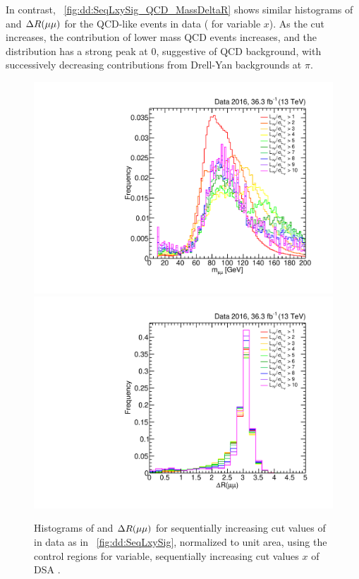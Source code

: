 In contrast, \Fig~\ref{fig:dd:SeqLxySig_QCD_MassDeltaR} shows similar histograms of \mMuMu and $\deltaR(\Pgm\Pgm)$ for the QCD-like events in data (\ie {} for variable $x$).
As the cut increases, the contribution of lower mass QCD events increases, and the \deltaR distribution has a strong peak at 0, suggestive of QCD background, with successively decreasing contributions from Drell-Yan backgrounds at $\pi$.

\begin{figure}[p]
  \centering
  \includegraphics[width=\DSquareWidth]{figures/displaced/BGEST_EffectOfLxySigCut_Mass_Data_DY-Like.pdf}
  \hspace*{-2em}
  \includegraphics[width=\DSquareWidth]{figures/displaced/BGEST_EffectOfLxySigCut_DeltaR_Data_DY-Like.pdf}
  \caption[Histograms of \mMuMu and $\deltaR(\Pgm\Pgm)$ for DY-like events in data for sequentially increasing cut values of \LxySig.]{Histograms of  \mMuMu and  $\deltaR(\Pgm\Pgm)$ for sequentially increasing cut values of \LxySig in data as in \Fig~\ref{fig:dd:SeqLxySig}, normalized to unit area, using the control regions  for variable, sequentially increasing cut values $x$ of DSA \LxySig.}
  \label{fig:dd:SeqLxySig_DY_MassDeltaR}
\end{figure}

